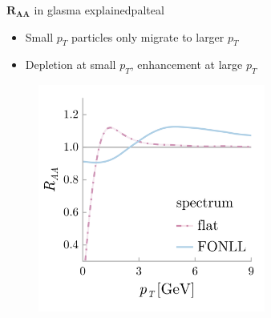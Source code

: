 \documentclass[aspectratio=169,11pt,usenames,dvipsnames]{beamer}
\begin{document}
\begin{frame}
\begin{columns}[onlytextwidth,t]
\begin{center}
       \end{center}
        \begin{center}
            \begin{custombox2}{\small$\boldsymbol{R_{AA}}$ in glasma explained}{palteal}
                \small
                \begin{varwidth}{\textwidth}
                \begin{itemize}\itemsep0em 
                    \itemsep0em
                    \scriptsize
                    \item Small $p_T$ particles only migrate to larger $p_T$
                    \item Depletion at small $p_T$, enhancement at large $p_T$
                \end{itemize}
                \end{varwidth}
            \end{custombox2}
            \vspace{-15pt}
            \begin{figure}
                \centering
                \includegraphics[width=0.7\textwidth]{images/final_sketch_raa_gl_fonll_v4_crop_2.png}
            \end{figure}
        \end{center}
       
    \end{columns}
\end{frame}
\end{document}
